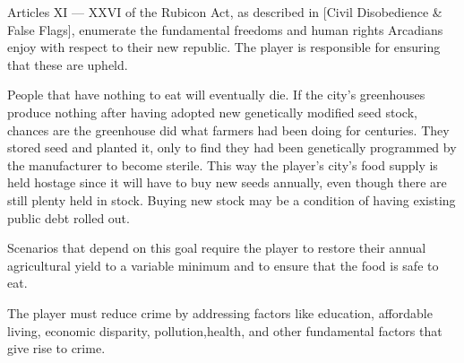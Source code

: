 
Articles XI --- XXVI of the Rubicon Act, as described in [Civil Disobedience & False Flags], enumerate the fundamental freedoms and human rights Arcadians enjoy with respect to their new republic. The player is responsible for ensuring that these are upheld.


People that have nothing to eat will eventually die. If the city's greenhouses produce nothing after having adopted new genetically modified seed stock, chances are the greenhouse did what farmers had been doing for centuries. They stored seed and planted it, only to find they had been genetically programmed by the manufacturer to become sterile. This way the player's city's food supply is held hostage since it will have to buy new seeds annually, even though there are still plenty held in stock. Buying new stock may be a condition of having existing public debt rolled out.

Scenarios that depend on this goal require the player to restore their annual agricultural yield to a variable minimum and to ensure that the food is safe to eat.


The player must reduce crime by addressing factors like education, affordable living, economic disparity, pollution,\footnotecite[drum2013] health, and other fundamental factors that give rise to crime.

